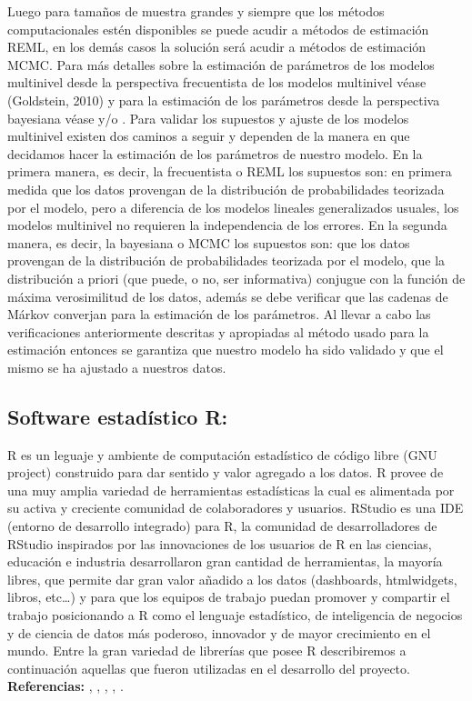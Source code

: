 \documentclass[]{article}
\theoremstyle{definition}
\theoremstyle{definition}
\theoremstyle{definition}
\theoremstyle{remark}
\begin{document}
Luego para tamaños de muestra grandes y siempre que los métodos
computacionales estén disponibles se puede acudir a métodos de
estimación REML, en los demás casos la solución será acudir a métodos de
estimación MCMC. Para más detalles sobre la estimación de parámetros de
los modelos multinivel desde la perspectiva frecuentista de los modelos
multinivel véase (Goldstein, 2010) y para la estimación de los
parámetros desde la perspectiva bayesiana véase \citep{Goldstein} y/o
\citep{HadfieldBook}. Para validar los supuestos y ajuste de los modelos
multinivel existen dos caminos a seguir y dependen de la manera en que
decidamos hacer la estimación de los parámetros de nuestro modelo. En la
primera manera, es decir, la frecuentista o REML los supuestos son: en
primera medida que los datos provengan de la distribución de
probabilidades teorizada por el modelo, pero a diferencia de los modelos
lineales generalizados usuales, los modelos multinivel no requieren la
independencia de los errores. En la segunda manera, es decir, la
bayesiana o MCMC los supuestos son: que los datos provengan de la
distribución de probabilidades teorizada por el modelo, que la
distribución a priori (que puede, o no, ser informativa) conjugue con la
función de máxima verosimilitud de los datos, además se debe verificar
que las cadenas de Márkov converjan para la estimación de los
parámetros. Al llevar a cabo las verificaciones anteriormente descritas
y apropiadas al método usado para la estimación entonces se garantiza
que nuestro modelo ha sido validado y que el mismo se ha ajustado a
nuestros datos.

\subsection{Software estadístico R:}\label{software-estadistico-r}

R es un leguaje y ambiente de computación estadístico de código libre
(GNU project) construido para dar sentido y valor agregado a los datos.
R provee de una muy amplia variedad de herramientas estadísticas la cual
es alimentada por su activa y creciente comunidad de colaboradores y
usuarios. RStudio es una IDE (entorno de desarrollo integrado) para R,
la comunidad de desarrolladores de RStudio inspirados por las
innovaciones de los usuarios de R en las ciencias, educación e industria
desarrollaron gran cantidad de herramientas, la mayoría libres, que
permite dar gran valor añadido a los datos (dashboards, htmlwidgets,
libros, etc\ldots{}) y para que los equipos de trabajo puedan promover y
compartir el trabajo posicionando a R como el lenguaje estadístico, de
inteligencia de negocios y de ciencia de datos más poderoso, innovador y
de mayor crecimiento en el mundo. Entre la gran variedad de librerías
que posee R describiremos a continuación aquellas que fueron utilizadas
en el desarrollo del proyecto. \textbf{Referencias:} \citep{r1},
\citep{wikiR}, \citep{wikiRStudio}, \citep{rstudio1}, \citep{rstudio2}.
\end{document}
